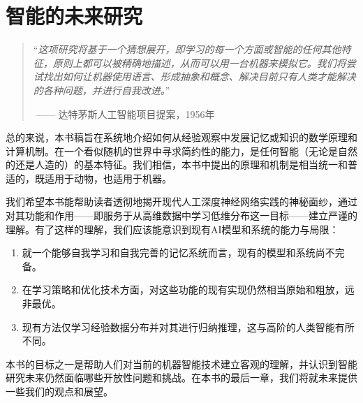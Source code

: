 \documentclass[../../book-main.tex]{subfiles}
\begin{document}
\chapter{智能的未来研究}
\label{ch:future}


  

\begin{quote}
“{\em 这项研究将基于一个猜想展开，即学习的每一个方面或智能的任何其他特征，原则上都可以被精确地描述，从而可以用一台机器来模拟它。我们将尝试找出如何让机器使用语言、形成抽象和概念、解决目前只有人类才能解决的各种问题，并进行自我改进。}”

$~$\hfill —— 达特茅斯人工智能项目提案，1956年
 \end{quote}
\vspace{5mm}


总的来说，本书稿旨在系统地介绍如何从经验观察中发展记忆或知识的数学原理和计算机制。在一个看似随机的世界中寻求简约性的能力，是任何智能（无论是自然的还是人造的）的基本特征。我们相信，本书中提出的原理和机制是相当统一和普适的，既适用于动物，也适用于机器。

我们希望本书能帮助读者透彻地揭开现代人工深度神经网络实践的神秘面纱，通过对其功能和作用——即服务于从高维数据中学习低维分布这一目标——建立严谨的理解。有了这样的理解，我们应该能意识到现有AI模型和系统的能力与局限：
\begin{enumerate}
    \item 就一个能够自我学习和自我完善的记忆系统而言，现有的模型和系统尚不完备。
    \item 在学习策略和优化技术方面，对这些功能的现有实现仍然相当原始和粗放，远非最优。
    \item 现有方法仅学习经验数据分布并对其进行归纳推理，这与高阶的人类智能有所不同。
\end{enumerate} 

本书的目标之一是帮助人们对当前的机器智能技术建立客观的理解，并认识到智能研究未来仍然面临哪些开放性问题和挑战。在本书的最后一章，我们将就未来提供一些我们的观点和展望。
\end{document}
